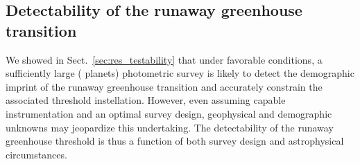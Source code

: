 \documentclass[twocolumn]{aastex631}
\begin{document}
\subsection{Detectability of the runaway greenhouse transition}
We showed in Sect.~\ref{sec:res_testability} that under favorable conditions, a sufficiently large ( planets) photometric survey is likely to detect the demographic imprint of the runaway greenhouse transition and accurately constrain the associated threshold instellation.
However, even assuming capable instrumentation and an optimal survey design, geophysical and demographic unknowns may jeopardize this undertaking.
The detectability of the runaway greenhouse threshold is thus a function of both survey design and astrophysical circumstances.
\end{document}
